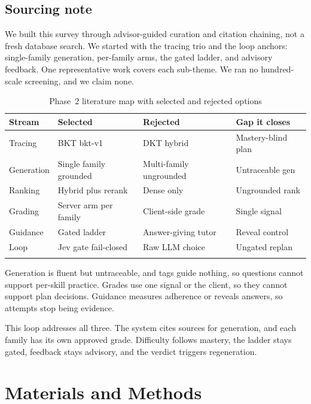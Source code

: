 \documentclass[sn-mathphys,Numbered]{sn-jnl}%
\theoremstyle{thmstyleone}%
\theoremstyle{thmstyletwo}%
\theoremstyle{thmstylethree}%
\begin{document}
\subsection{Sourcing note}\label{subsec25}

We built this survey through advisor-guided curation and citation chaining, not a fresh database search. We started with the tracing trio and the loop anchors: single-family generation, per-family arms, the gated ladder, and advisory feedback. One representative work covers each sub-theme. We ran no hundred-scale screening, and we claim none.

\begin{table}[htbp]
\caption{Phase~2 literature map with selected and rejected options}\label{tab:litphase2}%
\begin{tabular*}{\textwidth}{@{\extracolsep\fill}llll@{}}
\toprule
Stream & Selected & Rejected & Gap it closes\\
\midrule
Tracing & BKT bkt-v1 & DKT hybrid & Mastery-blind plan \\
Generation & Single family grounded & Multi-family ungrounded & Untraceable gen \\
Ranking & Hybrid plus rerank & Dense only & Ungrounded rank \\
Grading & Server arm per family & Client-side grade & Single signal \\
Guidance & Gated ladder & Answer-giving tutor & Reveal control \\
Loop & Jev gate fail-closed & Raw LLM choice & Ungated replan \\
\botrule
\end{tabular*}
\end{table}

Generation is fluent but untraceable, and tags guide nothing, so questions cannot support per-skill practice. Grades use one signal or the client, so they cannot support plan decisions. Guidance measures adherence or reveals answers, so attempts stop being evidence.

This loop addresses all three. The system cites sources for generation, and each family has its own approved grade. Difficulty follows mastery, the ladder stays gated, feedback stays advisory, and the verdict triggers regeneration.

\section{Materials and Methods}\label{sec3}
\end{document}
